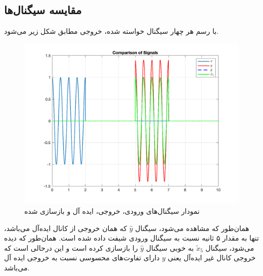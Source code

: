 \documentclass[10pt]{article}
\begin{document}
\subsection{مقایسه سیگنال‌ها}
با رسم هر چهار سیگنال خواسته شده، خروجی مطابق شکل زیر می‌شود.
\begin{figure}[h]
	\centering
	\includegraphics[width=1.1\linewidth]{../pics/q2-7}
	\caption{نمودار سیگنال‌های ورودی، خروجی، ایده آل و بازسازی شده}
	\label{fig:q2-7}
\end{figure}
همان‌طور که مشاهده می‌شود، سیگنال 
$\hat{y}$
که همان خروجی از کانال ایده‌آل می‌باشد،‌ تنها به مقدار ۵ ثانیه نسبت به سیگنال ورودی شیفت داده شده است. همان‌طور که دیده می‌شود، سیگنال 
$\tilde{x}_5$
به خوبی سیگنال 
$\hat{y}$
را بازسازی کرده است و این درحالی است که خروجی کانال غیر ایده‌آل یعنی 
$y$
دارای تفاوت‌های محسوسی نسبت به خروجی ایده آل می‌باشد. 
\end{document}
